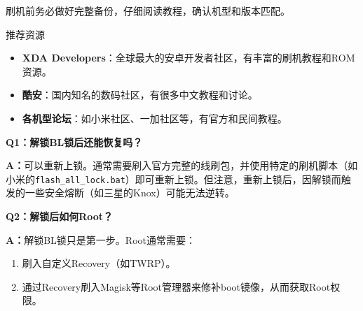 刷机前务必做好完整备份，仔细阅读教程，确认机型和版本匹配。

\begin{tcbinfo}{推荐资源}
\begin{itemize}
  \item \textbf{XDA Developers}：全球最大的安卓开发者社区，有丰富的刷机教程和ROM资源。
  \item \textbf{酷安}：国内知名的数码社区，有很多中文教程和讨论。
  \item \textbf{各机型论坛}：如小米社区、一加社区等，有官方和民间教程。
\end{itemize}

\end{tcbinfo}


\textbf{Q1：解锁BL锁后还能恢复吗？}\par

\textbf{A：}可以重新上锁。通常需要刷入官方完整的线刷包，并使用特定的刷机脚本（如小米的\texttt{flash\_all\_lock.\allowbreak bat}）即可重新上锁。但注意，重新上锁后，因解锁而触发的一些安全熔断（如三星的Knox）可能无法逆转。

\textbf{Q2：解锁后如何Root？}\par

\textbf{A：}解锁BL锁只是第一步。Root通常需要：

\begin{enumerate}
  \item 刷入自定义Recovery（如TWRP）。
  \item 通过Recovery刷入Magisk等Root管理器来修补boot镜像，从而获取Root权限。
\end{enumerate}
